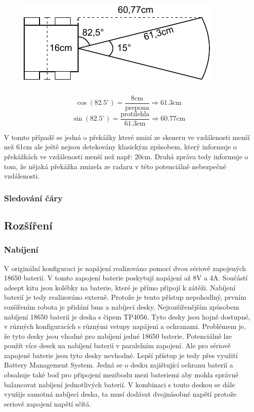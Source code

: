\begin{figure}[h!]
	\centering
	\begin{minipage}[c]{0.5\textwidth}
		\centering
		\includegraphics[scale=1.0]{obrazky-figures/ultrasonic_blind_spot.pdf}
	\end{minipage}%
	\begin{minipage}[c]{0.5\textwidth}
			$$\cos(82.5^\circ) = \frac{8\text{cm}}{\text{prepona}} \Rightarrow 61.3\text{cm}$$
			$$\sin(82.5^\circ) = \frac{\text{protilehla}}{61.3\text{cm}} \Rightarrow 60.77\text{cm}$$
	\end{minipage}
	\caption{}
	\label{}
\end{figure}

V tomto případě se jedná o překážky které zmizí ze skeneru ve vzdálenosti menší než 61cm ale ještě nejsou detekovány klasickým způsobem, který informuje o překážkách ve vzdálenosti menší než např: 20cm. Druhá zpráva tedy informuje o tom, že nějaká překážka zmizela ze radaru v této potenciálně nebezpečné vzdálenosti.


\subsubsection*{Sledování čáry}

\subsection*{Rozšíření}
\subsubsection*{Nabíjení}
V originální konfiguraci je napájení realizováno pomocí dvou sériově zapojených 18650 baterií. V tomto zapojení baterie poskytují napájení až 8V a 4A. Součástí adeept kitu jsou kolébky na baterie, které je přímo připojí k zátěži. Nabíjení baterií je tedy realizováno externě. Protože je tento přístup nepohodlný, prvním rozšířením robota je přidání bms a nabíjecí desky. 
Nejrozšířenějším způsobem nabíjení 18650 baterií je deska s čipem TP4056. Tyto desky jsou hojně dostupné, v různých konfiguracích s různými vstupy napájení a ochranami. Problémem je, že tyto desky jsou vhodné pro nabíjení jedné 18650 baterie. Potenciálně lze použít více desek na nabíjení baterií v paralelním zapojení. Ale pro sériově zapojené baterie jsou tyto desky nevhodné.
Lepší přístup je tedy přes využití Battery Management System. Jedná se o desku zajištující ochranu baterií a obsahuje také bod pro připojení mezibodu mezi bateriemi aby mohla správně balancovat nabíjení jednotlivých baterií. V kombinaci s touto deskou se dále využije samotná nabíjecí deska, ta musí dodávat dvojnásobné napětí protože seriové zapojení napětí sčítá.

